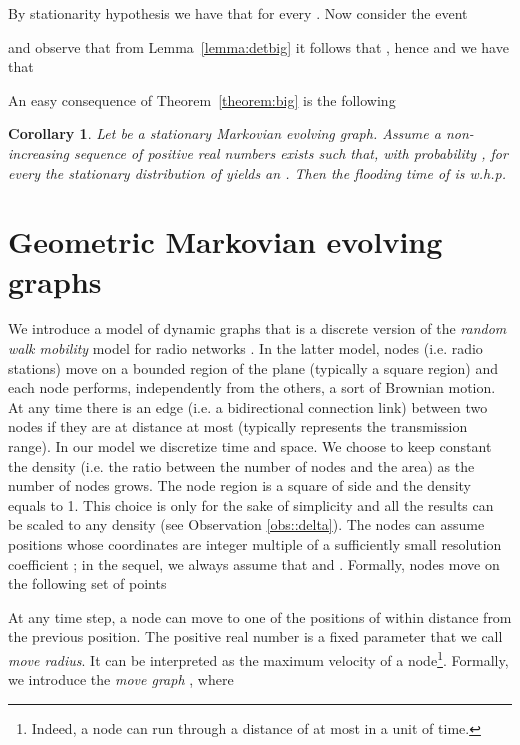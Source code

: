 \documentclass[10pt,a4paper]{article}
\newtheorem{cor}[definition]{Corollary}
\newcommand{\qed}{\hspace{\stretch{1}}}
\begin{document}
By stationarity hypothesis we have that  for every . Now consider the event

and observe that from Lemma~\ref{lemma:detbig} it follows that , hence  and we have that

\qed

\smallskip\noindent
An easy consequence of Theorem~\ref{theorem:big} is the  following

\begin{cor}\label{cor:big}
Let  be a stationary Markovian evolving graph.  Assume
a non-increasing sequence  of positive real numbers exists such
that, with probability , for every   the stationary distribution of  yields an
. Then the flooding time of  is
w.h.p.

\end{cor}




\section{Geometric Markovian evolving graphs} \label{sec::geom}

We introduce a model of dynamic graphs that is a discrete version of the \emph{random walk mobility} model for radio networks \cite{CBD02}. In the latter model, nodes (i.e. radio stations) move on a bounded region of the plane (typically a square region) and each node performs, independently from the others, a sort of Brownian motion. At any time there is an edge (i.e. a bidirectional connection link) between two nodes if they are at distance at most  (typically  represents the transmission range). In our model we discretize time and space. We choose to keep constant the density (i.e. the ratio between the number of nodes and the area) as the number  of nodes grows. The node region is a square of side  and the density equals to 1. This choice is only for the sake of
simplicity and all the results can be scaled to any density  (see Observation \ref{obs::delta}). 
The nodes can assume positions whose coordinates are integer multiple of a sufficiently small resolution coefficient ; in the sequel, we always assume that   and .
Formally, nodes move on the following set of points

At any time step, a node can move to one of the positions of  within distance  from the previous position. The positive real number  is a fixed parameter that we call \emph{move radius}. It can be interpreted as the maximum velocity of a node\footnote{Indeed, a node can run through a distance of at most  in a unit of time.}. Formally, we introduce the \emph{move graph} , where
\end{document}
